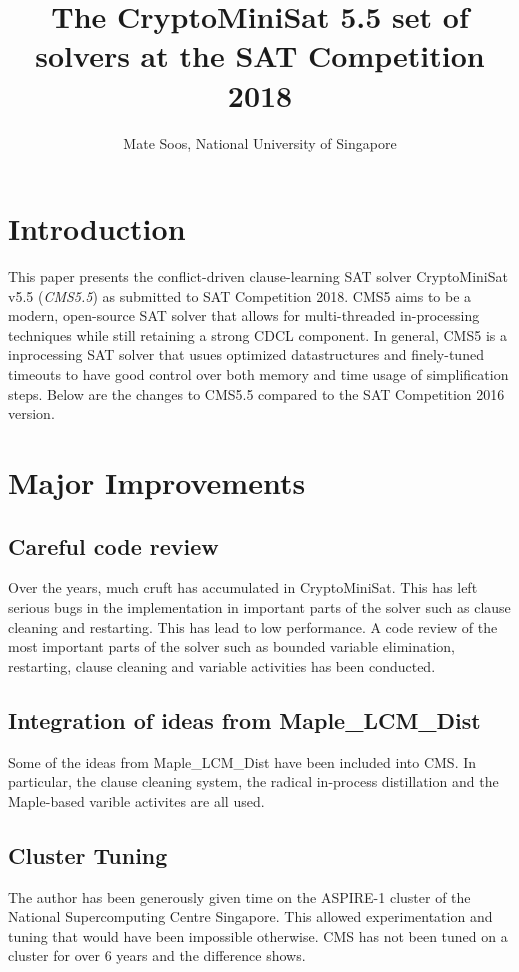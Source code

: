\documentclass[final]{ieee}
\begin{document}
\title{The CryptoMiniSat 5.5 set of solvers at the SAT Competition 2018}
\author{Mate Soos, National University of Singapore}

\maketitle
\thispagestyle{empty}
\pagestyle{empty}

\section{Introduction}
This paper presents the conflict-driven clause-learning SAT solver CryptoMiniSat v5.5 (\emph{CMS5.5}) as submitted to SAT Competition 2018. CMS5 aims to be a modern, open-source SAT solver that allows for multi-threaded in-processing techniques while still retaining a strong CDCL component. In general, CMS5 is a inprocessing SAT solver that usues optimized datastructures and finely-tuned timeouts to have good control over both memory and time usage of simplification steps. Below are the changes to CMS5.5 compared to the SAT Competition 2016 version.

\section{Major Improvements}
\subsection{Careful code review}
Over the years, much cruft has accumulated in CryptoMiniSat. This has left serious bugs in the implementation in important parts of the solver such as clause cleaning and restarting. This has lead to low performance. A code review of the most important parts of the solver such as bounded variable elimination, restarting, clause cleaning and variable activities has been conducted.

\subsection{Integration of ideas from Maple\_LCM\_Dist}
Some of the ideas from Maple\_LCM\_Dist\cite{maple} have been included into CMS. In particular, the clause cleaning system, the radical in-process distillation and the Maple-based varible activites are all used.

\subsection{Cluster Tuning}
The author has been generously given time on the ASPIRE-1 cluster of the National Supercomputing Centre Singapore\cite{nscc}. This allowed experimentation and tuning that would have been impossible otherwise. CMS has not been tuned on a cluster for over 6 years and the difference shows.
\end{document}
